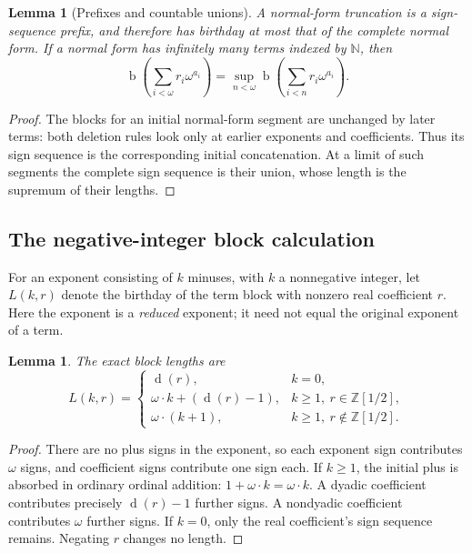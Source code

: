 \documentclass[11pt,letterpaper]{article}
\numberwithin{equation}{section}
\newtheorem{lemma}[theorem]{Lemma}
\theoremstyle{definition}
\theoremstyle{remark}
\newcommand{\N}{\mathbb{N}}
\newcommand{\D}{\mathbb{Z}[1/2]}
\newcommand{\bd}{\operatorname{b}}
\newcommand{\rd}{\operatorname{d}}
\begin{document}
\begin{lemma}[Prefixes and countable unions]\label{lem:prefix}
A normal-form truncation is a sign-sequence prefix, and therefore has birthday
at most that of the complete normal form. If a normal form has infinitely many
terms indexed by $\N$, then
\begin{equation}\label{eq:prefixsup}
 \bd\left(\sum_{i<\omega}r_i\omega^{a_i}\right)
 =\sup_{n<\omega}\bd\left(\sum_{i<n}r_i\omega^{a_i}\right).
\end{equation}
\end{lemma}
\begin{proof}
The blocks for an initial normal-form segment are unchanged by later terms:
both deletion rules look only at earlier exponents and coefficients. Thus its
sign sequence is the corresponding initial concatenation. At a limit of such
segments the complete sign sequence is their union, whose length is the
supremum of their lengths.
\end{proof}

\subsection{The negative-integer block calculation}
For an exponent consisting of $k$ minuses, with $k$ a nonnegative integer, let
$L(k,r)$ denote the birthday of the term block with nonzero real coefficient
$r$. Here the exponent is a \emph{reduced} exponent; it need not equal the
original exponent of a term.

\begin{lemma}\label{lem:block}
The exact block lengths are
\begin{equation}\label{eq:block}
L(k,r)=
\begin{cases}
 \rd(r),&k=0,\\
 \omega\cdot k+(\rd(r)-1),&k\geq1,\ r\in\D,\\
 \omega\cdot(k+1),&k\geq1,\ r\notin\D.
\end{cases}
\end{equation}
\end{lemma}
\begin{proof}
There are no plus signs in the exponent, so each exponent sign contributes
$\omega$ signs, and coefficient signs contribute one sign each. If $k\geq1$,
the initial plus is absorbed in ordinary ordinal addition:
$1+\omega\cdot k=\omega\cdot k$. A dyadic coefficient contributes precisely
$\rd(r)-1$ further signs. A nondyadic coefficient contributes $\omega$ further
signs. If $k=0$, only the real coefficient's sign sequence remains. Negating
$r$ changes no length.
\end{proof}
\end{document}

